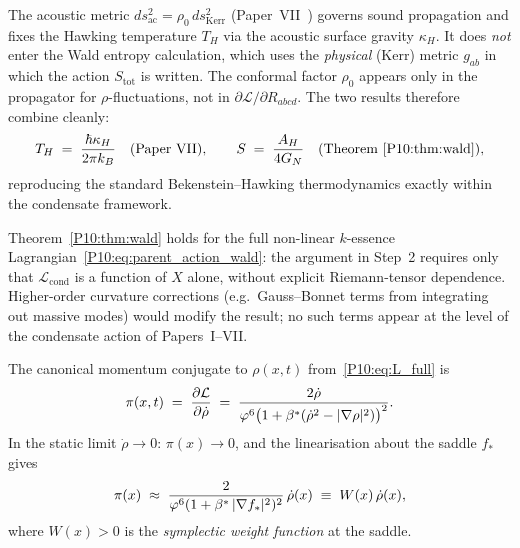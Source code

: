 \begin{remark}
\label{P10:rem:acoustic_wald}
The acoustic metric $ds^2_\mathrm{ac} = \rho_0\,ds^2_\mathrm{Kerr}$
(Paper~VII~\cite{Paper7}) governs sound propagation and fixes the
Hawking temperature $T_H$ via the acoustic surface gravity $\kappa_H$.
It does \emph{not} enter the Wald entropy calculation, which uses
the \emph{physical} (Kerr) metric $g_{ab}$ in which the action
$S_\mathrm{tot}$ is written.
The conformal factor $\rho_0$ appears only in the propagator for
$\rho$-fluctuations, not in $\partial\mathcal{L}/\partial R_{abcd}$.
The two results therefore combine cleanly:
\begin{equation}
  T_H \;=\; \frac{\hbar\kappa_H}{2\pi k_B}
  \quad\text{(Paper~VII)},
  \qquad
  S \;=\; \frac{A_H}{4G_N}
  \quad\text{(Theorem~\ref{P10:thm:wald})},
  \label{P10:eq:TS_combined}
\end{equation}
reproducing the standard Bekenstein--Hawking thermodynamics exactly
within the condensate framework.
\end{remark}

\begin{remark}
\label{P10:rem:wald_scope}
Theorem~\ref{P10:thm:wald} holds for the full non-linear $k$-essence
Lagrangian~\eqref{P10:eq:parent_action_wald}: the argument in Step~2 requires only that
$\mathcal{L}_\mathrm{cond}$ is a function of $X$ alone, without
explicit Riemann-tensor dependence.
Higher-order curvature corrections (e.g.\ Gauss--Bonnet terms from
integrating out massive modes) would modify the result; no such terms
appear at the level of the condensate action of Papers~I--VII.
\end{remark}

\begin{lemma}
\label{P10:lem:momentum}
The canonical momentum conjugate to $\rho(x,t)$ from~\eqref{P10:eq:L_full} is
\begin{equation}
  \pi(x,t)
  \;=\; \frac{\partial\mathcal{L}}{\partial\dot\rho}
  \;=\; \frac{2\dot\rho}{\varphi^6\bigl(1+\beta^{*}(\dot\rho^2-|\nabla\rho|^2)\bigr)^2}.
  \label{P10:eq:momentum}
\end{equation}
In the static limit $\dot\rho\to0$:
$\pi(x)\to 0$, and the linearisation about the saddle $f_*$ gives
\begin{equation}
  \pi(x) \;\approx\; \frac{2}{\varphi^6(1+\beta^{*}\,|\nabla f_*|^2)^2}\,\dot\rho(x)
  \;\equiv\; W(x)\,\dot\rho(x),
  \label{P10:eq:momentum_linear}
\end{equation}
where $W(x) > 0$ is the \emph{symplectic weight function} at the saddle.
\end{lemma}


